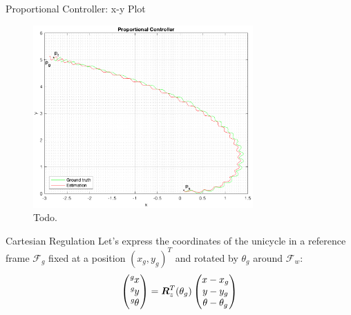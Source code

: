 \documentclass[10pt]{beamer}
\begin{document}
    \begin{frame}{Proportional Controller: x-y Plot}
        \begin{figure}
            \caption{Todo.}
            \includegraphics[width=0.75\textwidth]{images/proportional_controller.png}
        \end{figure}
    \end{frame}

    \begin{frame}{Cartesian Regulation}
        \justifying
        Let's express the coordinates of the unicycle in a reference frame
        $\mathcal{F}_g$ fixed at a position $(x_g, y_g)^T$ and
        rotated by $\theta_g$ around $\mathcal{F}_w$:
        \begin{equation*}
            \begin{pmatrix}
                \tensor[^g]{x}{} \\
                \tensor[^g]{y}{} \\
                \tensor[^g]{\theta}{}
            \end{pmatrix}
                =
            \bm{R}_z^T(\theta_g)
            \begin{pmatrix}
                x - x_g \\
                y - y_g \\
                \theta - \theta_g
            \end{pmatrix}
        \end{equation*}
    \end{frame}
\end{document}
